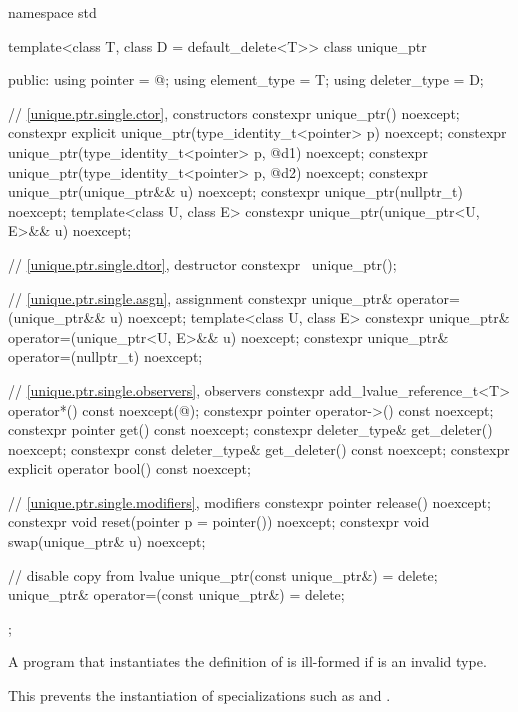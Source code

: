 %
\begin{codeblock}
namespace std {
  template<class T, class D = default_delete<T>> class unique_ptr {
  public:
    using pointer      = @\seebelow@;
    using element_type = T;
    using deleter_type = D;

    // \ref{unique.ptr.single.ctor}, constructors
    constexpr unique_ptr() noexcept;
    constexpr explicit unique_ptr(type_identity_t<pointer> p) noexcept;
    constexpr unique_ptr(type_identity_t<pointer> p, @\seebelow@ d1) noexcept;
    constexpr unique_ptr(type_identity_t<pointer> p, @\seebelow@ d2) noexcept;
    constexpr unique_ptr(unique_ptr&& u) noexcept;
    constexpr unique_ptr(nullptr_t) noexcept;
    template<class U, class E>
      constexpr unique_ptr(unique_ptr<U, E>&& u) noexcept;

    // \ref{unique.ptr.single.dtor}, destructor
    constexpr ~unique_ptr();

    // \ref{unique.ptr.single.asgn}, assignment
    constexpr unique_ptr& operator=(unique_ptr&& u) noexcept;
    template<class U, class E>
      constexpr unique_ptr& operator=(unique_ptr<U, E>&& u) noexcept;
    constexpr unique_ptr& operator=(nullptr_t) noexcept;

    // \ref{unique.ptr.single.observers}, observers
    constexpr add_lvalue_reference_t<T> operator*() const noexcept(@\seebelow@);
    constexpr pointer operator->() const noexcept;
    constexpr pointer get() const noexcept;
    constexpr deleter_type& get_deleter() noexcept;
    constexpr const deleter_type& get_deleter() const noexcept;
    constexpr explicit operator bool() const noexcept;

    // \ref{unique.ptr.single.modifiers}, modifiers
    constexpr pointer release() noexcept;
    constexpr void reset(pointer p = pointer()) noexcept;
    constexpr void swap(unique_ptr& u) noexcept;

    // disable copy from lvalue
    unique_ptr(const unique_ptr&) = delete;
    unique_ptr& operator=(const unique_ptr&) = delete;
  };
}
\end{codeblock}

\pnum
A program that instantiates the definition of 
is ill-formed if  is an invalid type.
\begin{note}
This prevents the instantiation of specializations such as
 and .
\end{note}

